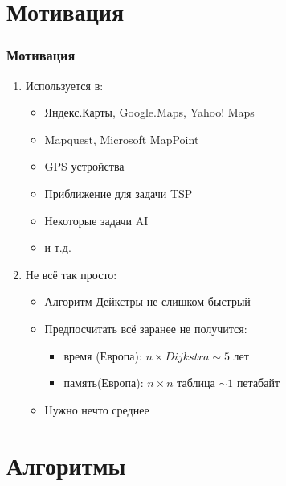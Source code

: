 \documentclass{beamer}
\begin{document}

\section{Мотивация}

\begin{frame}
\frametitle{Мотивация}
\begin{enumerate}

\item Используется в:

  \begin{itemize}
  \item Яндекс.Карты, Google.Maps, Yahoo! Maps
  \item Mapquest, Microsoft MapPoint
  \item GPS устройства
  \item Приближение для задачи TSP
  \item Некоторые задачи AI
  \item и т.д.
  \end{itemize}

\item Не всё так просто:

  \begin{itemize}
  \item Алгоритм Дейкстры не слишком быстрый
  \item Предпосчитать всё заранее не получится:
  	\begin{itemize}	
    \item время (Европа): $n \times Dijkstra \sim 5$ лет 
    \item память(Европа): $n \times n$ таблица $\sim 1$ петабайт  
    \end{itemize}
  \item Нужно нечто среднее
  \end{itemize}
  
\end{enumerate}

\end{frame}


\section{Алгоритмы}
\end{document}
